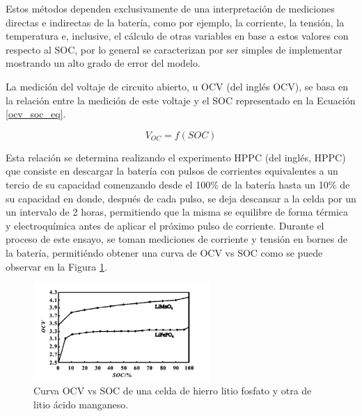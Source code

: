 \documentclass[10pt,a4paper]{article}
\newcounter{subsubsubsection}[subsubsection]
\begin{document}
Estos m\'etodos dependen exclusivamente de una interpretaci\'on de mediciones
directas e indirectas de la bater\'ia, como por ejemplo, la corriente, 
la tensi\'on, la temperatura e, inclusive, el c\'alculo de otras variables en
base a estos valores con respecto al \acrshort{SOC}, por lo general se
caracterizan por ser simples de implementar mostrando un alto grado de error del
modelo. 

\label{ocv_section}

\noindent La medici\'on del voltaje de circuito abierto, u \acrshort{OCV} (del
ingl\'es \acrlong{OCV}), se basa en la relaci\'on entre la medici\'on de este 
voltaje y el \acrshort{SOC} representado en la Ecuaci\'on \ref{ocv_soc_eq}.

\begin{equation}
    V_{OC} = f(SOC) \label{ocv_soc_eq}
\end{equation}

\noindent Esta relaci\'on se determina realizando el experimento \acrshort{HPPC} 
(del ingl\'es, \acrlong{HPPC}) que consiste en descargar la bater\'ia con pulsos 
de corrientes equivalentes a un tercio de su capacidad comenzando desde el 
100\% de la bater\'ia hasta un 10\% de su capacidad en donde, despu\'es de cada 
pulso, se deja descansar a la celda por un un intervalo de 2 horas, permitiendo 
que la misma se equilibre de forma t\'ermica y electroqu\'imica antes de aplicar 
el pr\'oximo pulso de corriente. Durante el proceso de este ensayo, se toman 
mediciones de corriente y tensi\'on en bornes de la bater\'ia, permiti\'endo 
obtener una curva de \acrshort{OCV} vs \acrshort{SOC} como se puede observar en 
la Figura \ref{soc_ocv_paper}.

\begin{figure}[h!]
    \begin{center}
        \includegraphics[width=0.6\textwidth]{soc_ocv_paper.png}
        \caption{Curva \acrshort{OCV} vs \acrshort{SOC} de una celda de hierro
        litio fosfato y otra de litio \'acido manganeso.}
        \label{soc_ocv_paper}
    \end{center}
\end{figure}
\end{document}

